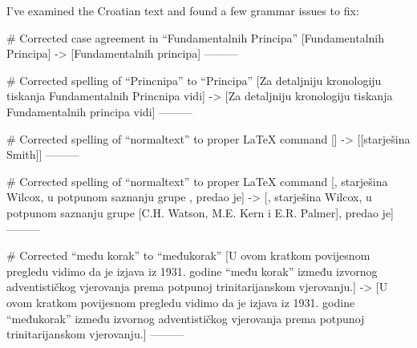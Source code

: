 I've examined the Croatian text and found a few grammar issues to fix:

# Corrected case agreement in “Fundamentalnih Principa”
[Fundamentalnih Principa]
->
[Fundamentalnih principa]
---------

# Corrected spelling of “Princnipa” to “Principa”
[Za detaljniju kronologiju tiskanja Fundamentalnih Princnipa vidi]
->
[Za detaljniju kronologiju tiskanja Fundamentalnih principa vidi]
---------

# Corrected spelling of “normaltext” to proper LaTeX command
[]
->
[\textnormal{[starješina Smith]}]
---------

# Corrected spelling of “normaltext” to proper LaTeX command
[, starješina Wilcox, u potpunom saznanju grupe , predao je]
->
[, starješina Wilcox, u potpunom saznanju grupe \textnormal{[C.H. Watson, M.E. Kern i E.R. Palmer]}, predao je]
---------

# Corrected “među korak” to “međukorak”
[U ovom kratkom povijesnom pregledu vidimo da je izjava iz 1931. godine “među korak” između izvornog adventističkog vjerovanja prema potpunoj trinitarijanskom vjerovanju.]
->
[U ovom kratkom povijesnom pregledu vidimo da je izjava iz 1931. godine “međukorak” između izvornog adventističkog vjerovanja prema potpunoj trinitarijanskom vjerovanju.]
---------